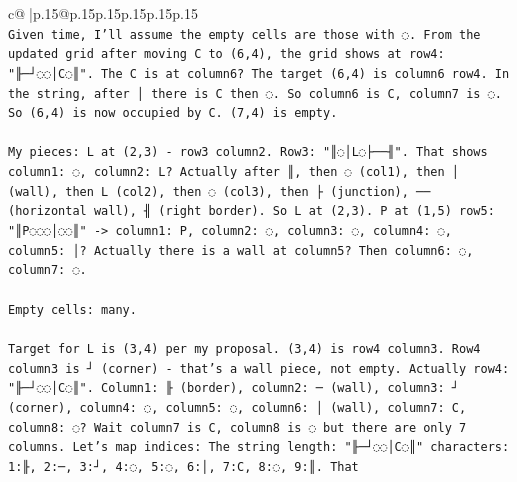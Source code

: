 \documentclass{article}
\begin{document}
{\begin{supertabular}{c@{$\;$}|p{.15\linewidth}@{}p{.15\linewidth}p{.15\linewidth}p{.15\linewidth}p{.15\linewidth}p{.15\linewidth}}
{{{\\ 
\texttt{Given time, I'll assume the empty cells are those with ◌. From the updated grid after moving C to (6,4), the grid shows at row4: "╟─┘◌◌│C◌║". The C is at column6? The target (6,4) is column6 row4. In the string, after │ there is C then ◌. So column6 is C, column7 is ◌. So (6,4) is now occupied by C. (7,4) is empty.} \\
\\ 
\texttt{My pieces: L at (2,3) {-} row3 column2. Row3: "║◌│L◌├──╢". That shows column1: ◌, column2: L? Actually after ║, then ◌ (col1), then │ (wall), then L (col2), then ◌ (col3), then ├ (junction), ── (horizontal wall), ╢ (right border). So L at (2,3). P at (1,5) row5: "║P◌◌◌│◌◌║" {-}> column1: P, column2: ◌, column3: ◌, column4: ◌, column5: │? Actually there is a wall at column5? Then column6: ◌, column7: ◌.} \\
\\ 
\texttt{Empty cells: many.} \\
\\ 
\texttt{Target for L is (3,4) per my proposal. (3,4) is row4 column3. Row4 column3 is ┘ (corner) {-} that's a wall piece, not empty. Actually row4: "╟─┘◌◌│C◌║". Column1: ╟ (border), column2: ─ (wall), column3: ┘ (corner), column4: ◌, column5: ◌, column6: │ (wall), column7: C, column8: ◌? Wait column7 is C, column8 is ◌ but there are only 7 columns. Let's map indices: The string length: "╟─┘◌◌│C◌║" characters: 1:╟, 2:─, 3:┘, 4:◌, 5:◌, 6:│, 7:C, 8:◌, 9:║. That} \\
            }
        }
    }
     \\ \\


\end{supertabular}}
\end{document}

